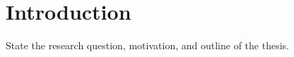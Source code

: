 \chapter{Introduction}
\label{ch:introduction}

State the research question, motivation, and outline of the thesis.
